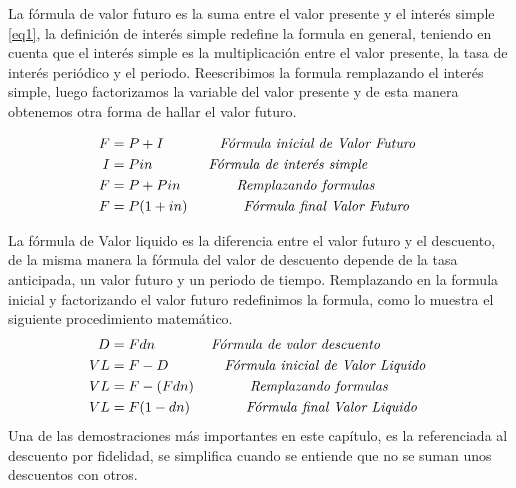 \begin{spacing}{1.5}
 La fórmula de valor futuro es la suma entre el valor presente y el interés simple \ref{eq1}, la definición de interés simple  redefine la formula en general, teniendo en cuenta que el interés simple es la multiplicación entre el valor presente, la tasa de interés periódico y el periodo. Reescribimos la formula remplazando el interés simple, luego factorizamos la variable del valor presente y de esta manera obtenemos otra forma de hallar el valor futuro.
 \begin{center}
  \begin{align*}
   F & = P+I\hspace{40 pt} \textit{Fórmula inicial de Valor Futuro } \\
   I & = Pin\hspace{40 pt} \textit{Fórmula de interés simple}        \\
   F & = P+Pin\hspace{40 pt} \textit{Remplazando formulas}           \\
   F & = P(1+in)\hspace{40 pt} \textit{Fórmula final Valor Futuro}
  \end{align*}
 \end{center}
 La fórmula de Valor liquido es la diferencia entre el valor futuro y el descuento, de la misma manera la fórmula del valor de descuento depende de la tasa anticipada, un valor futuro y un periodo de tiempo. Remplazando en la formula inicial y factorizando el valor futuro redefinimos la formula, como lo muestra el siguiente procedimiento matemático.
 \clearpage
 \begin{align*}
  D  & = Fdn\hspace{40 pt} \textit{Fórmula de valor descuento }       \\
  VL & = F-D\hspace{40 pt} \textit{Fórmula inicial de Valor Liquido } \\
  VL & = F-(Fdn)\hspace{40 pt} \textit{Remplazando formulas}          \\
  VL & = F(1-dn)\hspace{40 pt}\textit{Fórmula final Valor Liquido}
 \end{align*}
 Una de las demostraciones más importantes en este capítulo, es la referenciada al descuento por fidelidad, se simplifica cuando se entiende que no se suman unos descuentos con otros. %

\end{spacing}
